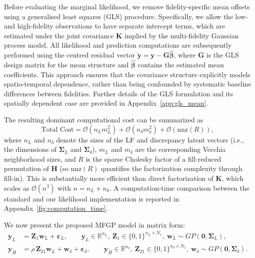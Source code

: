 \documentclass[12pt]{article}
\begin{document}
Before evaluating the marginal likelihood, we remove fidelity-specific mean offsets using a generalised least squares (GLS) procedure. 
Specifically, we allow the low- and high-fidelity observations to have separate intercept terms, which are estimated under the joint covariance $\bm{K}$ implied by the multi-fidelity Gaussian process model. 
All likelihood and prediction computations are subsequently performed using the 
centred residual vector $\tilde{\bm{y}} = \bm{y} - \bm{G}\hat{\bm{\beta}}$, 
where $\bm{G}$ is the GLS design matrix for the mean structure and 
$\hat{\bm{\beta}}$ contains the estimated mean coefficients. This approach 
ensures that the covariance structure explicitly models spatio-temporal 
dependence, rather than being confounded by systematic baseline differences 
between fidelities. Further details of the GLS formulation and its spatially 
dependent case are provided in Appendix~\ref{app:gls_mean}.



The resulting dominant computational cost can be summarized as
\[
\text{Total Cost}
=
\mathcal{O}\!\left(n_L m_L^2\right)
+
\mathcal{O}\!\left(n_\delta m_\delta^2\right)
+
\mathcal{O}\!\left(\mathrm{nnz}(R)\right),
\]
where $n_L$ and $n_\delta$ denote the sizes of the LF and discrepancy latent vectors (i.e., the dimensions of $\boldsymbol{\Sigma}_L$ and $\boldsymbol{\Sigma}_\delta$), $m_L$ and $m_\delta$ are the corresponding Vecchia neighborhood sizes, and $R$ is the sparse Cholesky factor of a fill-reduced permutation of $\bm{H}$ (so $\mathrm{nnz}(R)$ quantifies the factorization complexity through fill-in). This is substantially more efficient than direct factorization of $\bm{K}$, which scales as $\mathcal{O}(n^3)$ with $n=n_L+n_\delta$. A computation-time comparison between the standard and our likelihood implementation is reported in Appendix~\ref{fig:computation_time}.

We now present the proposed MFGP model in matrix form:
\begin{equation}
\begin{split}
\bm{y}_L &= \bm{Z}_1 \bm{w}_L + \bm{\varepsilon}_L,
\qquad \bm{y}_L \in \mathbb{R}^{n_L},\ 
\bm{Z}_1 \in \{0,1\}^{n_L \times N_1},\ 
\bm{w}_L \sim GP\!\left(\bm{0}, \boldsymbol{\Sigma}_L\right), \\
\bm{y}_H &= \rho\, \bm{Z}_{21}\bm{w}_L + \bm{w}_\delta + \bm{\varepsilon}_\delta,
\qquad \bm{y}_H \in \mathbb{R}^{n_\delta},\ 
\bm{Z}_{21}\in \{0,1\}^{n_\delta \times N_1},\ 
\bm{w}_\delta \sim GP\!\left(\bm{0}, \boldsymbol{\Sigma}_\delta\right).
\end{split}
\end{equation}
\end{document}
